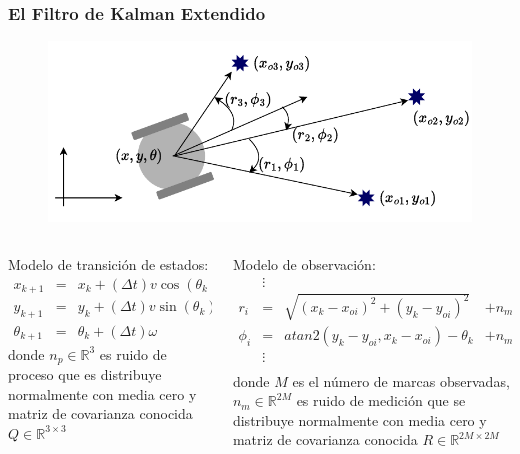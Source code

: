 \begin{frame}\frametitle{El Filtro de Kalman Extendido}
  \begin{figure}
    \centering
    \includegraphics[height=0.4\textheight]{Figures/EKF1.pdf}
  \end{figure}
  \begin{columns}
    \begin{column}{0.45\textwidth}
      Modelo de transición de estados:
      \[\left.
      \begin{array}{cclc}
        x_{k+1}      &=& x_k + (\Delta t)v\cos(\theta_k) & + n_{p1}\\
        y_{k+1}      &=& y_k + (\Delta t)v\sin(\theta_k) & + n_{p2}\\
        \theta_{k+1} &=& \theta_k + (\Delta t)\omega     & + n_{p3}
      \end{array}\right\}f(x)
    \]
    donde $n_p\in\mathbb{R}^3$ es ruido de proceso que es distribuye normalmente con
    media cero y matriz de covarianza conocida $Q\in\mathbb{R}^{3\times 3}$
    \end{column}
    \begin{column}{0.55\textwidth}
      Modelo de observación:
      \[\left.
        \begin{array}{cclc}
                 &\vdots& & \\
        r_{i}    &=& \sqrt{(x_k - x_{oi})^2 + (y_k - y_{oi})^2}   & + n_{m1}\\
        \phi_{i} &=& atan2(y_k - y_{oi}, x_k - x_{oi}) - \theta_k & + n_{m2}\\
                 &\vdots& & \\
      \end{array}\right\}h(x)
    \]
    donde $M$ es el número de marcas observadas, $n_m\in\mathbb{R}^{2M}$ es ruido de medición que se distribuye normalmente con media cero y matriz de covarianza conocida $R\in\mathbb{R}^{2M\times 2M}$
    \end{column}
  \end{columns}
\end{frame}

